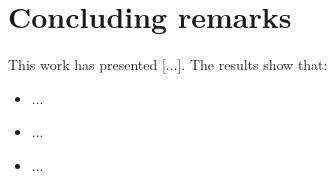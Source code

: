 \chapter{Concluding remarks} \label{sec: Conclusion}

This work has presented [...]. The results show that:
\begin{itemize}
    \item ...
    \item ...
    \item ...
\end{itemize}
